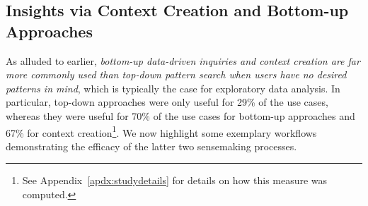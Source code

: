  
 \subsection{Insights via Context Creation and Bottom-up Approaches}%
 \par As alluded to earlier,
 \emph{bottom-up data-driven inquiries
 and context creation are far more commonly
 used than top-down pattern search
 when users have no desired patterns in mind},
 which is typically the case for exploratory data analysis.
 In particular, top-down approaches were only useful for 29\% of the use cases,
 whereas they were useful for 70\% of the use cases
 for bottom-up approaches and 67\%
 for context creation\footnote{See Appendix~\ref{apdx:studydetails} for details on how this measure was computed.}. We now highlight some exemplary workflows demonstrating the efficacy of the latter two sensemaking processes.
